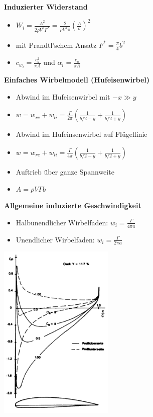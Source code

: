 \documentclass[8pt, landscape, fleqn]{scrartcl}
\begin{document}
\begin{multicols*}{3}
\textbf{Induzierter Widerstand}




\begin{itemize} 
    \item $W_i = \frac{A^2}{2\rho V^2F^*} = \frac{2}{\rho V^2 \pi}\left(\frac{A}{b}\right)^2$
    \item mit Prandtl'schem Ansatz $F^* = \frac{\pi}{4}b^2$
    \item $c_{w_i} = \frac{c_a^2}{\pi \Lambda}$ und $\alpha_i = \frac{c_a}{\pi \Lambda}$
\end{itemize}

\textbf{Einfaches Wirbelmodell (Hufeisenwirbel)}

\begin{itemize}
    \item Abwind im Hufeisenwirbel mit $-x \gg y$
    \item $w = w_{re}+ w_{li} = \frac{\Gamma}{2\pi}\left(\frac{1}{b/2-y}+\frac{1}{b/2+y}\right)$
    \item Abwind im Hufeinsenwirbel auf Flügellinie
    \item $w = w_{re}+ w_{li} = \frac{\Gamma}{4\pi}\left(\frac{1}{b/2-y}+\frac{1}{b/2+y}\right)$
    \item Auftrieb über ganze Spannweite
    \item $A = \rho V \Gamma b$
\end{itemize}
\textbf{Allgemeine induzierte Geschwindigkeit}
\begin{itemize}
    \item Halbunendlicher Wirbelfaden: $w_i = \frac{\Gamma}{4\pi a}$
    \item Unendlicher Wirbelfaden: $w_i = \frac{\Gamma}{2\pi a}$
\end{itemize}

\begin{center}
    \includegraphics[width = 5.5cm]{Druckverteilung_am_Profil.png}
\end{center}



\end{multicols*}
\end{document}
